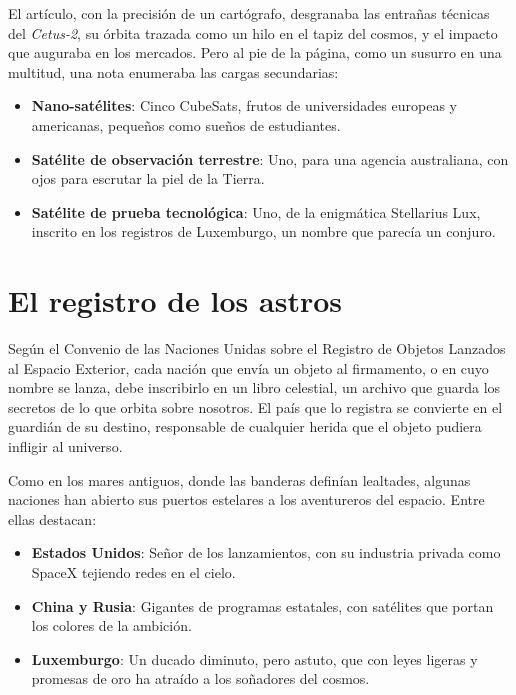 El artículo, con la precisión de un cartógrafo, desgranaba las entrañas técnicas del \emph{Cetus-2}, su órbita trazada como un hilo en el tapiz del cosmos, y el impacto que auguraba en los mercados. Pero al pie de la página, como un susurro en una multitud, una nota enumeraba las cargas secundarias:

\begin{itemize}
    \item \textbf{Nano-satélites}: Cinco CubeSats, frutos de universidades europeas y americanas, pequeños como sueños de estudiantes.
    \item \textbf{Satélite de observación terrestre}: Uno, para una agencia australiana, con ojos para escrutar la piel de la Tierra.
    \item \textbf{Satélite de prueba tecnológica}: Uno, de la enigmática Stellarius Lux, inscrito en los registros de Luxemburgo, un nombre que parecía un conjuro.
\end{itemize}

\section{El registro de los astros}

Según el Convenio de las Naciones Unidas sobre el Registro de Objetos Lanzados al Espacio Exterior, cada nación que envía un objeto al firmamento, o en cuyo nombre se lanza, debe inscribirlo en un libro celestial, un archivo que guarda los secretos de lo que orbita sobre nosotros. El país que lo registra se convierte en el guardián de su destino, responsable de cualquier herida que el objeto pudiera infligir al universo.

Como en los mares antiguos, donde las banderas definían lealtades, algunas naciones han abierto sus puertos estelares a los aventureros del espacio. Entre ellas destacan:

\begin{itemize}
    \item \textbf{Estados Unidos}: Señor de los lanzamientos, con su industria privada como SpaceX tejiendo redes en el cielo.
    \item \textbf{China y Rusia}: Gigantes de programas estatales, con satélites que portan los colores de la ambición.
    \item \textbf{Luxemburgo}: Un ducado diminuto, pero astuto, que con leyes ligeras y promesas de oro ha atraído a los soñadores del cosmos.
\end{itemize}

